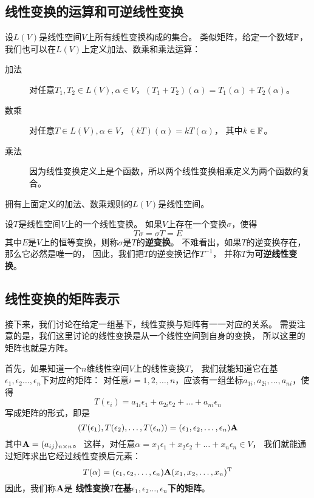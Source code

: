 \subsection{线性变换的运算和可逆线性变换}
设$L(V)$是线性空间$V$上所有线性变换构成的集合。
类似矩阵，给定一个数域$\mathbb{F}$，
我们也可以在$L(V)$上定义加法、数乘和乘法运算：
\begin{description}
  \item[加法]
  对任意$T_1,T_2\in L(V),\alpha\in V$，$(T_1+T_2)(\alpha)=T_1(\alpha)+T_2(\alpha)$。
  \item[数乘]
  对任意$T\in L(V),\alpha\in V$，$(kT)(\alpha)=kT(\alpha)$，
  其中$k\in\mathbb{F}$。
  \item[乘法]
  因为线性变换定义上是个函数，所以两个线性变换相乘定义为两个函数的复合。
\end{description}

\begin{theorem}
  拥有上面定义的加法、数乘规则的$L(V)$是线性空间。
\end{theorem}

\begin{definition}[可逆线性变换]
  设$T$是线性空间$V$上的一个线性变换。
  如果$V$上存在一个变换$\sigma$，使得
  \[ T\sigma = \sigma T = E \]
  其中$E$是$V$上的恒等变换，则称$\sigma$是$T$的\textbf{逆变换}。
  不难看出，如果$T$的逆变换存在，那么它必然是唯一的，
  因此，我们把$T$的逆变换记作$T^{-1}$，
  并称$T$为\textbf{可逆线性变换}。
\end{definition}

\subsection{线性变换的矩阵表示}
接下来，我们讨论在给定一组基下，线性变换与矩阵有一一对应的关系。
需要注意的是，我们这里讨论的线性变换是从一个线性空间到自身的变换，
所以这里的矩阵也就是方阵。

首先，如果知道一个$n$维线性空间$V$上的线性变换$T$，
我们就能知道它在基$\epsilon_1,\epsilon_2\dots,\epsilon_n$下对应的矩阵：
对任意$i=1,2,\dots,n$，应该有一组坐标$a_{1i},a_{2i},\dots,a_{ni}$，使得
\begin{displaymath}
  T(\epsilon_i) = a_{1i}\epsilon_1+a_{2i}\epsilon_2+\dots+a_{ni}\epsilon_n
\end{displaymath}
写成矩阵的形式，即是
\begin{displaymath}
  (T(\epsilon_1), T(\epsilon_2),\dots,T(\epsilon_n)) =
    (\epsilon_1,\epsilon_2,\dots,\epsilon_n)\mathbf{A}
\end{displaymath}
其中$\mathbf{A}=(a_{ij})_{n\times n}$。
这样，对任意$\alpha=x_1\epsilon_1+x_2\epsilon_2+\dots+x_n\epsilon_n\in V$，
我们就能通过矩阵求出它经过线性变换后元素：
\begin{equation} \label{eq-coord-after-linear-trans}
  T(\alpha) = (\epsilon_1,\epsilon_2,\dots,\epsilon_n)\mathbf{A}
    (x_1,x_2,\dots,x_n)^{\textrm{T}}
\end{equation}
因此，我们称$\mathbf{A}$是
\textbf{线性变换$T$在基$\epsilon_1,\epsilon_2\dots,\epsilon_n$下的矩阵}。

